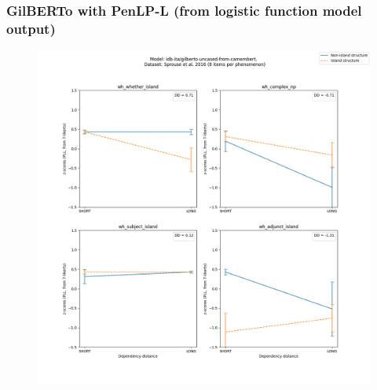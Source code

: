 \subsubsection{GilBERTo with PenLP-L (from logistic function model output)}
\begin{figure}[h]
	\centering
	\includegraphics[width=1\textwidth]{images/AppendixA/Sprouse_wh_idb-ita_gilberto-uncased-from-camembert_PLL-zscores-likert-2022-07-11.png} 
\end{figure}

\clearpage
